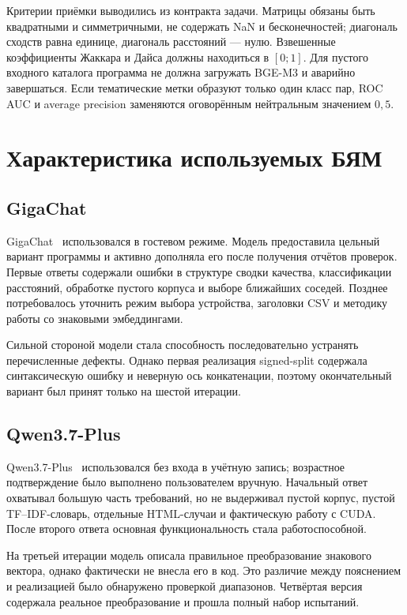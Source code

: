 \documentclass[a4paper,12pt]{extreport}
\begin{document}
Критерии приёмки выводились из контракта задачи. Матрицы обязаны быть квадратными и симметричными, не содержать NaN и бесконечностей; диагональ сходств равна единице, диагональ расстояний --- нулю. Взвешенные коэффициенты Жаккара и Дайса должны находиться в $[0;1]$. Для пустого входного каталога программа не должна загружать BGE-M3 и аварийно завершаться. Если тематические метки образуют только один класс пар, ROC AUC и average precision заменяются оговорённым нейтральным значением $0{,}5$.

\section{Характеристика используемых БЯМ}

\subsection{GigaChat}

GigaChat~\cite{gigachat} использовался в гостевом режиме. Модель предоставила цельный вариант программы и активно дополняла его после получения отчётов проверок. Первые ответы содержали ошибки в структуре сводки качества, классификации расстояний, обработке пустого корпуса и выборе ближайших соседей. Позднее потребовалось уточнить режим выбора устройства, заголовки CSV и методику работы со знаковыми эмбеддингами.

Сильной стороной модели стала способность последовательно устранять перечисленные дефекты. Однако первая реализация signed-split содержала синтаксическую ошибку и неверную ось конкатенации, поэтому окончательный вариант был принят только на шестой итерации.

\subsection{Qwen3.7-Plus}

Qwen3.7-Plus~\cite{qwen} использовался без входа в учётную запись; возрастное подтверждение было выполнено пользователем вручную. Начальный ответ охватывал большую часть требований, но не выдерживал пустой корпус, пустой TF--IDF-словарь, отдельные HTML-случаи и фактическую работу с CUDA. После второго ответа основная функциональность стала работоспособной.

На третьей итерации модель описала правильное преобразование знакового вектора, однако фактически не внесла его в код. Это различие между пояснением и реализацией было обнаружено проверкой диапазонов. Четвёртая версия содержала реальное преобразование и прошла полный набор испытаний.
\end{document}
